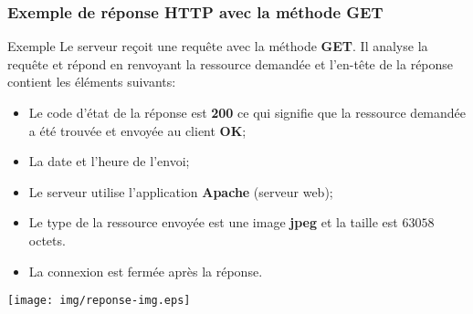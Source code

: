 \documentclass[8pt]{beamer}
\begin{document}
\begin{frame}
\frametitle{Exemple de réponse HTTP avec la méthode GET}

\begin{exampleblock}{Exemple}
Le serveur reçoit une requête avec la méthode \textbf{GET}. Il analyse la requête et répond en renvoyant la ressource demandée et l'en-tête de la réponse contient les éléments suivants:

\begin{itemize}
\item Le code d'état de la réponse est \textbf{200} ce qui signifie que la ressource demandée a été trouvée et envoyée au client \textbf{OK};
\item La date et l'heure de l'envoi;
\item Le serveur utilise l'application \textbf{Apache} (serveur web);
\item Le type de la ressource envoyée est une image \textbf{jpeg} et la taille est $63058$ octets.
\item La connexion est fermée après la réponse. 
\end{itemize}
\begin{center}
\texttt{[image: img/reponse-img.eps]}
\end{center}

\end{exampleblock}

\end{frame}


%
%
%
\end{document}

